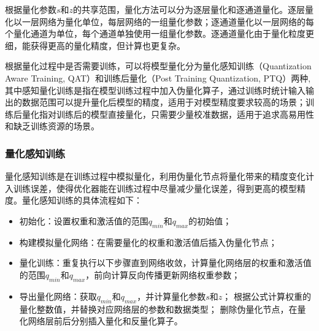 \documentclass[letterpaper,10pt,english]{sphinxmanual}
\begin{document}
\sphinxAtStartPar
根据量化参数\(s\)和\(z\)的共享范围，量化方法可以分为逐层量化和逐通道量化。逐层量化以一层网络为量化单位，每层网络的一组量化参数；逐通道量化以一层网络的每个量化通道为单位，每个通道单独使用一组量化参数。逐通道量化由于量化粒度更细，能获得更高的量化精度，但计算也更复杂。

\sphinxAtStartPar
根据量化过程中是否需要训练，可以将模型量化分为量化感知训练（Quantization
Aware Training, QAT）和训练后量化（Post Training Quantization,
PTQ）两种,其中感知量化训练是指在模型训练过程中加入伪量化算子，通过训练时统计输入输出的数据范围可以提升量化后模型的精度，适用于对模型精度要求较高的场景；训练后量化指对训练后的模型直接量化，只需要少量校准数据，适用于追求高易用性和缺乏训练资源的场景。


\subsubsection{量化感知训练}
\label{\detokenize{chapter_model_deployment/model_compression:id3}}
\sphinxAtStartPar
量化感知训练是在训练过程中模拟量化，利用伪量化节点将量化带来的精度变化计入训练误差，使得优化器能在训练过程中尽量减少量化误差，得到更高的模型精度。量化感知训练的具体流程如下：
\begin{itemize}
\item {} 
\sphinxAtStartPar
初始化：设置权重和激活值的范围\(q_{min}\)和\(q_{max}\)的初始值；

\item {} 
\sphinxAtStartPar
构建模拟量化网络：在需要量化的权重和激活值后插入伪量化节点；

\item {} 
\sphinxAtStartPar
量化训练：重复执行以下步骤直到网络收敛，计算量化网络层的权重和激活值的范围\(q_{min}\)和\(q_{max}\)，前向计算反向传播更新网络权重参数；

\item {} 
\sphinxAtStartPar
导出量化网络：获取\(q_{min}\)和\(q_{max}\)，并计算量化参数\(s\)和\(z\)；
根据公式计算权重的量化整数值，并替换对应网络层的参数和数据类型；
删除伪量化节点，在量化网络层前后分别插入量化和反量化算子。

\end{itemize}
\end{document}
